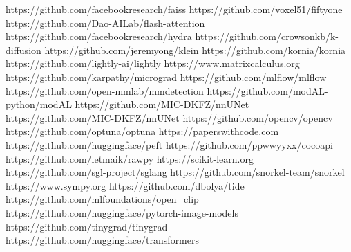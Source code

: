 \expandafter\def\csname repourl@faiss\endcsname{https://github.com/facebookresearch/faiss}
\expandafter\def\csname repourl@fiftyone\endcsname{https://github.com/voxel51/fiftyone}
\expandafter\def\csname repourl@flash-attention\endcsname{https://github.com/Dao-AILab/flash-attention}
\expandafter\def\csname repourl@hydra\endcsname{https://github.com/facebookresearch/hydra}
\expandafter\def\csname repourl@k-diffusion\endcsname{https://github.com/crowsonkb/k-diffusion}
\expandafter\def\csname repourl@klein\endcsname{https://github.com/jeremyong/klein}
\expandafter\def\csname repourl@kornia\endcsname{https://github.com/kornia/kornia}
\expandafter\def\csname repourl@lightly-train\endcsname{https://github.com/lightly-ai/lightly}
\expandafter\def\csname repourl@matrixcalculus.org\endcsname{https://www.matrixcalculus.org}
\expandafter\def\csname repourl@micrograd\endcsname{https://github.com/karpathy/micrograd}
\expandafter\def\csname repourl@mlflow\endcsname{https://github.com/mlflow/mlflow}
\expandafter\def\csname repourl@mmdetection\endcsname{https://github.com/open-mmlab/mmdetection}
\expandafter\def\csname repourl@modAL\endcsname{https://github.com/modAL-python/modAL}
\expandafter\def\csname repourl@nnU-Net\endcsname{https://github.com/MIC-DKFZ/nnUNet}
\expandafter\def\csname repourl@nnUNet\endcsname{https://github.com/MIC-DKFZ/nnUNet}
\expandafter\def\csname repourl@opencv\endcsname{https://github.com/opencv/opencv}
\expandafter\def\csname repourl@optuna\endcsname{https://github.com/optuna/optuna}
\expandafter\def\csname repourl@paperswithcode\endcsname{https://paperswithcode.com}
\expandafter\def\csname repourl@peft\endcsname{https://github.com/huggingface/peft}
\expandafter\def\csname repourl@pycocotools\endcsname{https://github.com/ppwwyyxx/cocoapi}
\expandafter\def\csname repourl@rawpy\endcsname{https://github.com/letmaik/rawpy}
\expandafter\def\csname repourl@scikit-learn\endcsname{https://scikit-learn.org}
\expandafter\def\csname repourl@sglang\endcsname{https://github.com/sgl-project/sglang}
\expandafter\def\csname repourl@snorkel\endcsname{https://github.com/snorkel-team/snorkel}
\expandafter\def\csname repourl@sympy\endcsname{https://www.sympy.org}
\expandafter\def\csname repourl@tide\endcsname{https://github.com/dbolya/tide}
\expandafter\def\csname repourl@open_clip\endcsname{https://github.com/mlfoundations/open_clip}
\expandafter\def\csname repourl@timm\endcsname{https://github.com/huggingface/pytorch-image-models}
\expandafter\def\csname repourl@tinygrad\endcsname{https://github.com/tinygrad/tinygrad}
\expandafter\def\csname repourl@transformers\endcsname{https://github.com/huggingface/transformers}
